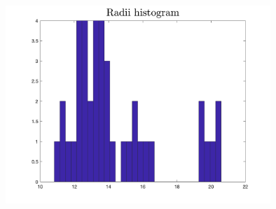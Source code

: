 \documentclass[oneside,a4paper]{article}
\begin{document}
\begin{figure}[ht!]
\centering
\includegraphics[width=100mm]{figures/assign_3d.png}
\caption{}
\label{fig:resultbac}
\end{figure}













%
%
%
\end{document}
